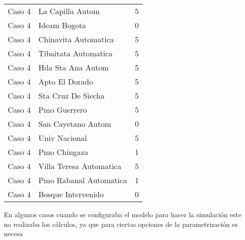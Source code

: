 \begin{itemize}
\begin{longtable}{lll}
Caso 4 & La Capilla Autom  & 5 \\
Caso 4 & Ideam Bogota  & 0 \\
Caso 4 & Chinavita Automatica  & 5 \\
Caso 4 & Tibaitata Automatica  & 5 \\
Caso 4 & Hda Sta Ana Autom  & 5 \\
Caso 4 & Apto El Dorado  & 5 \\
Caso 4 & Sta Cruz De Siecha  & 5 \\
Caso 4 & Pmo Guerrero  & 5 \\
Caso 4 & San Cayetano Autom   & 0 \\
Caso 4 & Univ Nacional  & 5 \\
Caso 4 & Pmo Chingaza  & 1 \\
Caso 4 & Villa Teresa Automatica  & 5 \\
Caso 4 & Pmo Rabanal Automatica   & 1 \\
Caso 4 & Bosque Intervenido    & 0 \\

\end{longtable}

En algunos casos cuando se configuraba el modelo para hacer la simulación este no realizaba los cálculos, ya que para ciertas opciones de la parametrización es necesa


\end{itemize}
